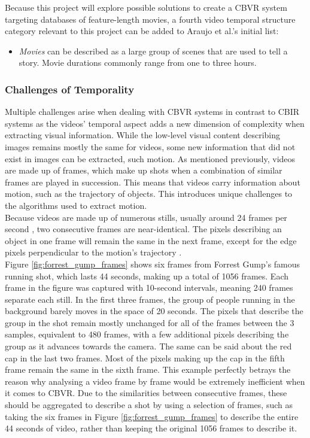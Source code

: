Because this project will explore possible solutions to create a CBVR system targeting databases of feature-length movies, a fourth video temporal structure category relevant to this project can be added to Araujo et al.'s initial list:
\begin{itemize}
    \item \textit{Movies} can be described as a large group of scenes that are used to tell a story. Movie durations commonly range from one to three hours.
\end{itemize}

\subsubsection{Challenges of Temporality}
\label{sec:litsurvey-challenges-temporality}

Multiple challenges arise when dealing with CBVR systems in contrast to CBIR systems as the videos' temporal aspect adds a new dimension of complexity when extracting visual information. While the low-level visual content describing images remains mostly the same for videos, some new information that did not exist in images can be extracted, such motion. As mentioned previously, videos are made up of frames, which make up shots when a combination of similar frames are played in succession. This means that videos carry information about motion, such as the trajectory of objects. This introduces unique challenges to the algorithms used to extract motion.\\

Because videos are made up of numerous stills, usually around 24 frames per second \cite{brownlow1980silentfilm}, two consecutive frames are near-identical. The pixels describing an object in one frame will remain the same in the next frame, except for the edge pixels perpendicular to the motion's trajectory \cite{bradski2008opencv}.\\

Figure \ref{fig:forrest_gump_frames} shows six frames from Forrest Gump's famous running shot, which lasts 44 seconds, making up a total of 1056 frames. Each frame in the figure was captured with 10-second intervals, meaning 240 frames separate each still. In the first three frames, the group of people running in the background barely moves in the space of 20 seconds. The pixels that describe the group in the shot remain mostly unchanged for all of the frames between the 3 samples, equivalent to 480 frames, with a few additional pixels describing the group as it advances towards the camera. The same can be said about the red cap in the last two frames. Most of the pixels making up the cap in the fifth frame remain the same in the sixth frame. This example perfectly betrays the reason why analysing a video frame by frame would be extremely inefficient when it comes to CBVR. Due to the similarities between consecutive frames, these should be aggregated \cite{araujo2017i2v} to describe a shot by using a selection of frames, such as taking the six frames in Figure \ref{fig:forrest_gump_frames} to describe the entire 44 seconds of video, rather than keeping the original 1056 frames to describe it.

